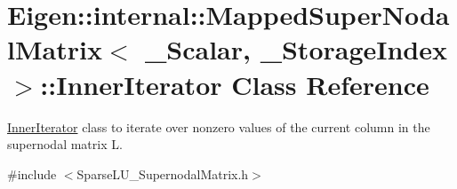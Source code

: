 \hypertarget{class_eigen_1_1internal_1_1_mapped_super_nodal_matrix_1_1_inner_iterator}{}\section{Eigen\+::internal\+::Mapped\+Super\+Nodal\+Matrix$<$ \+\_\+\+Scalar, \+\_\+\+Storage\+Index $>$\+::Inner\+Iterator Class Reference}
\label{class_eigen_1_1internal_1_1_mapped_super_nodal_matrix_1_1_inner_iterator}


\mbox{\hyperlink{class_eigen_1_1internal_1_1_mapped_super_nodal_matrix_1_1_inner_iterator}{Inner\+Iterator}} class to iterate over nonzero values of the current column in the supernodal matrix L.  




{\ttfamily \#include $<$Sparse\+L\+U\+\_\+\+Supernodal\+Matrix.\+h$>$}

